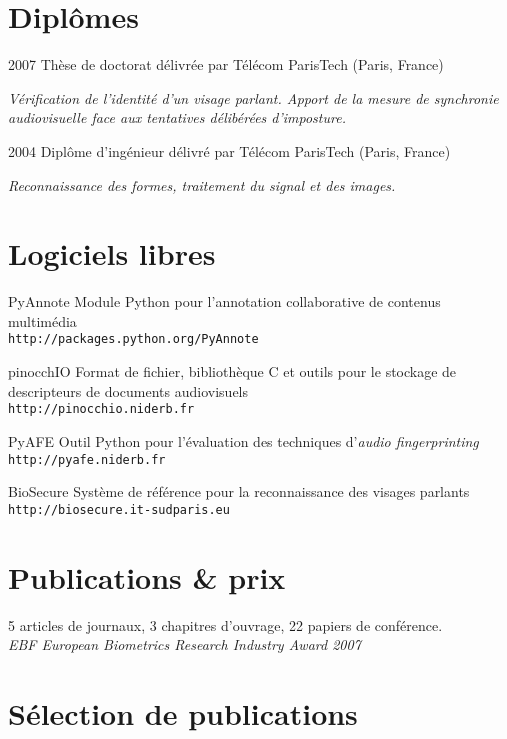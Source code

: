 \documentclass{simplecv}
\begin{document}
\section{Dipl\^{o}mes}

\begin{topic}
\item[2007] Th\`{e}se de doctorat d\'{e}livr\'{e}e par T\'{e}l\'{e}com ParisTech (Paris, France)

\emph{V{\'e}rification de l'identit{\'e} d'un visage parlant. Apport de la mesure de synchronie audiovisuelle face aux tentatives d{\'e}lib{\'e}r{\'e}es d'imposture.}

\item[2004] Dipl\^{o}me d'ing\'{e}nieur d\'{e}livr\'{e} par T\'{e}l\'{e}com ParisTech (Paris, France)

\emph{Reconnaissance des formes, traitement du signal et des images.}
\end{topic}

\section{Logiciels libres}
\begin{topic}
\item[PyAnnote] Module Python pour l'annotation collaborative de contenus multim\'{e}dia\\
\texttt{\small http://packages.python.org/PyAnnote}
\item[pinocchIO] Format de fichier, biblioth\`{e}que C et outils pour le stockage de descripteurs de documents audiovisuels\\
\texttt{\small http://pinocchio.niderb.fr}
\item[PyAFE] Outil Python pour l'\'{e}valuation des techniques d'\emph{audio fingerprinting}~\cite{Ramona2011}\\
\texttt{\small http://pyafe.niderb.fr}
\item[BioSecure] Syst\`{e}me de r\'{e}f\'{e}rence pour la reconnaissance des visages parlants~\cite{Bredin2006a}\\
\texttt{\small http://biosecure.it-sudparis.eu}
\end{topic}

\section{Publications \& prix}

5 articles de journaux, 3 chapitres d'ouvrage, 22 papiers de conf\'{e}rence.\\
\emph{EBF European Biometrics Research Industry Award 2007}~\cite{Bredin2008}

\section{S\'{e}lection de publications}
\nocite{Bredin2012,Bredin2012a,Ramona2011,Bredin2009,Bredin2008,Bredin2007,Argones-Rua2007a,Bredin2006a}


\end{document}
